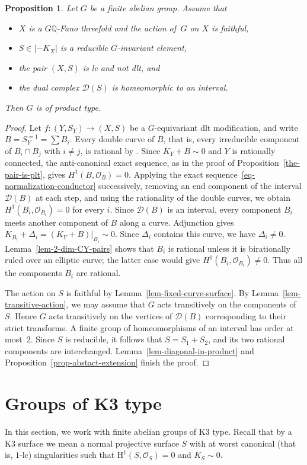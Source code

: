 \documentclass[11pt]{amsart}
\numberwithin{equation}{section}
\newtheorem{proposition}[thm]{Proposition}
\theoremstyle{definition}
\theoremstyle{remark}
\newcommand{\OOO}{\mathscr{O}}
\begin{document}
\begin{proposition}
\label{prop-reducible-3}
Let $G$ be a finite abelian group. 
Assume that 
\begin{itemize}
\item
$X$ is a $G\mathbb{Q}$-Fano threefold and the action of\, $G$ on $X$ is faithful,
\item 
$S\in |-K_X|$ is a reducible $G$-invariant element,
\item 
the pair $(X, S)$ is lc and not dlt, and
\item
the dual complex $\mathcal{D}(S)$ is homeomorphic to an interval. 
\end{itemize}
Then $G$ is of product type.
\end{proposition}
\begin{proof}
{
Let $f\colon (Y,S_Y)\to (X,S)$ be a $G$-equivariant dlt modification,
and write $B=S_Y^{=1}=\sum B_i$. Every double curve of $B$, that is, every irreducible component of $B_i\cap B_j$ with $i\ne j$, is rational by
\cite[Claim~32.1]{KX16}. Since $K_Y+B\sim0$ and $Y$ is rationally
connected, the anti-canonical exact sequence, as in the proof of
Proposition~\ref{the-pair-is-plt}, gives $H^1(B,\OOO_B)=0$. Applying
the exact sequence~\eqref{eq-normalization-conductor} successively,
removing an end component of the interval $\mathcal D(B)$ at each step,
and using the rationality of the double curves, we obtain
$H^1(B_i,\OOO_{B_i})=0$ for every $i$. Since $\mathcal D(B)$ is an
interval, every component $B_i$ meets another component of $B$ along
a curve. Adjunction gives
$K_{B_i}+\Delta_i=(K_Y+B)|_{B_i}\sim0$. Since $\Delta_i$ contains
this curve, we have $\Delta_i\ne0$. Lemma~\ref{lem-2-dim-CY-pairs}
shows that $B_i$ is rational unless it is birationally ruled over an
elliptic curve; the latter case would give $H^1(B_i,\OOO_{B_i})\ne0$.
Thus all the components $B_i$ are rational.

The action on $S$ is faithful by Lemma~\ref{lem-fixed-curve-surface}.
By Lemma~\ref{lem-transitive-action}, we may assume that $G$ acts
transitively on the components of $S$. Hence $G$ acts transitively on
the vertices of $\mathcal D(B)$ corresponding to their strict transforms. A finite
group of homeomorphisms of an interval has order at most~$2$.
Since $S$ is reducible, it follows that $S=S_1+S_2$, and its two
rational components are interchanged. Lemma~\ref{lem-diagonal-in-product}
and Proposition~\ref{prop-abstact-extension} finish the proof.
}
\end{proof}

\section{Groups of K3 type}
\label{sect-action-on-K3}
In this section, we work with finite abelian groups of K3 type. Recall that by a K3 surface we mean a normal projective surface
$S$ with at worst canonical (that is, $1$-lc) singularities such that
$\mathrm{H}^1(S, \OOO_S)=0$ and $K_S\sim 0$. 
\end{document}
